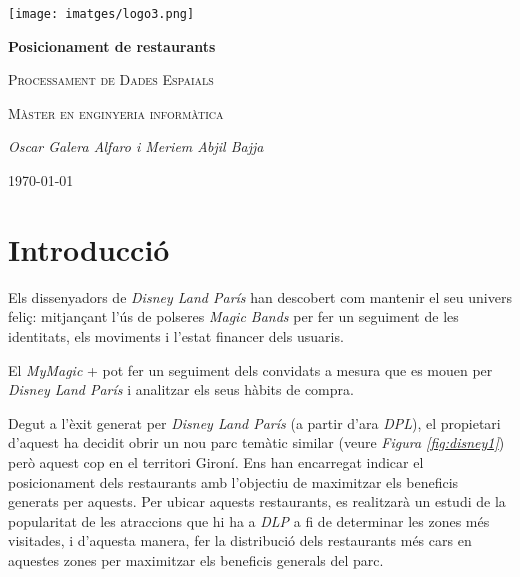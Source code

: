 \documentclass[12pt]{article}
\begin{document}
\begin{titlepage}
		\centering
		\texttt{[image: imatges/logo3.png]}\par\vspace{1cm}
		{\huge\bfseries Posicionament de restaurants\par}
		\vspace{0.3cm}
		{\scshape\Large Processament de Dades Espaials\par}
		\vspace{0.2cm}
		{\scshape\Large Màster en enginyeria informàtica\par}
		\vspace{1.5cm}
		{\Large\itshape Oscar Galera Alfaro i Meriem Abjil Bajja\par}
		\vfill
		{\large \today\par}
\end{titlepage}
\tableofcontents

\clearpage

\listoffigures

\clearpage

\section{Introducció}

Els dissenyadors de \textit{Disney Land París} han descobert com mantenir el seu univers feliç: mitjançant l'ús de polseres \textit{Magic Bands} per fer un seguiment de les identitats, els moviments i l'estat financer dels usuaris.

El \textit{MyMagic } +  pot fer un seguiment dels convidats a mesura que es mouen per \textit{Disney Land París} i analitzar els seus hàbits de compra.

Degut a l'èxit generat per \textit{Disney Land París} (a partir d'ara \textit{DPL}), el propietari d'aquest ha decidit obrir un nou parc temàtic similar (veure \textit{Figura \ref{fig:disney1}}) però aquest cop en el territori Gironí. Ens han encarregat indicar el posicionament dels restaurants amb l'objectiu de maximitzar els beneficis generats per aquests. Per ubicar aquests restaurants, es realitzarà un estudi de la popularitat de les atraccions que hi ha a \textit{DLP} a fi de determinar les zones més visitades, i d'aquesta manera, fer la distribució dels restaurants més cars en aquestes zones per maximitzar els beneficis generals del parc.
\end{document}
